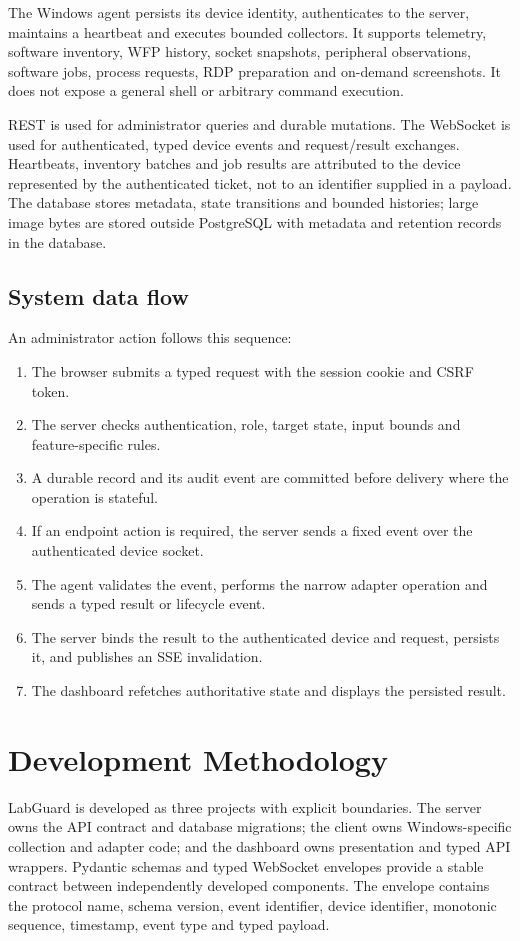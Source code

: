 \documentclass[12pt,a4paper]{report}
\begin{document}
The Windows agent persists its device identity, authenticates to the server,
maintains a heartbeat and executes bounded collectors. It supports telemetry,
software inventory, WFP history, socket snapshots, peripheral observations,
software jobs, process requests, RDP preparation and on-demand screenshots.
It does not expose a general shell or arbitrary command execution.

REST is used for administrator queries and durable mutations. The WebSocket is
used for authenticated, typed device events and request/result exchanges.
Heartbeats, inventory batches and job results are attributed to the device
represented by the authenticated ticket, not to an identifier supplied in a
payload. The database stores metadata, state transitions and bounded histories;
large image bytes are stored outside PostgreSQL with metadata and retention
records in the database.

\subsection{System data flow}
An administrator action follows this sequence:
\begin{enumerate}
\item The browser submits a typed request with the session cookie and CSRF
token.
\item The server checks authentication, role, target state, input bounds and
feature-specific rules.
\item A durable record and its audit event are committed before delivery where
the operation is stateful.
\item If an endpoint action is required, the server sends a fixed event over
the authenticated device socket.
\item The agent validates the event, performs the narrow adapter operation and
sends a typed result or lifecycle event.
\item The server binds the result to the authenticated device and request,
persists it, and publishes an SSE invalidation.
\item The dashboard refetches authoritative state and displays the persisted
result.
\end{enumerate}

\section{Development Methodology}
LabGuard is developed as three projects with explicit boundaries. The server
owns the API contract and database migrations; the client owns Windows-specific
collection and adapter code; and the dashboard owns presentation and typed API
wrappers. Pydantic schemas and typed WebSocket envelopes provide a stable
contract between independently developed components. The envelope contains the
protocol name, schema version, event identifier, device identifier, monotonic
sequence, timestamp, event type and typed payload.
\end{document}
